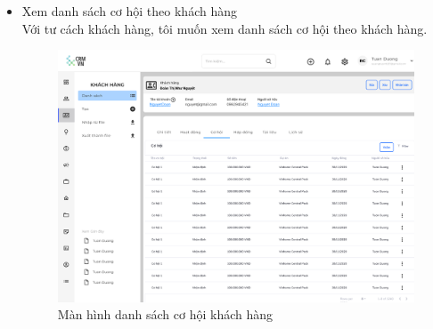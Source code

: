 \documentclass[12pt,a4paper]{article}
\begin{document}
\begin{enumerate}
\begin{itemize}
            \item Xem danh sách cơ hội theo khách hàng \\
            Với tư cách khách hàng, tôi muốn xem danh sách cơ hội theo khách hàng.

            \begin{figure}[H]
                \centering \includegraphics[width=\textwidth]{Img/Nguyet/Khachhang/xemdanhsachcohoi.png}
                \vspace{0.5cm}
                \caption{Màn hình danh sách cơ hội khách hàng}
                \label{dscohoiKH}
            \end{figure}



\end{itemize}
\end{enumerate}
\end{document}
